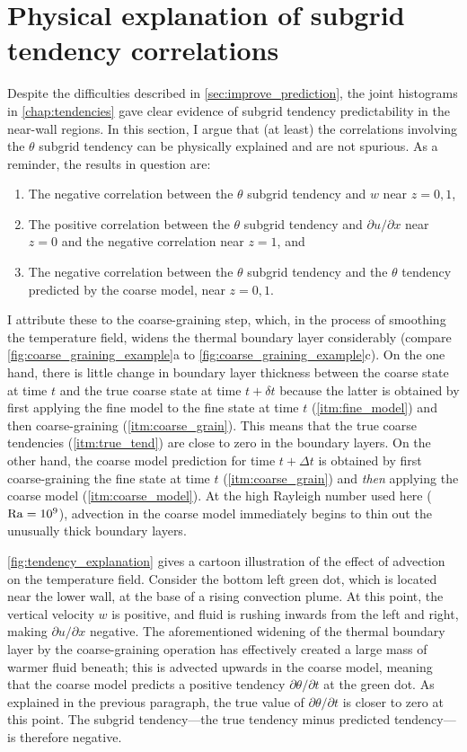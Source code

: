 \documentclass[../main.tex]{subfiles}
\begin{document}
\section{Physical explanation of subgrid tendency correlations}
\label{sec:tendency_explanation}
Despite the difficulties described in \cref{sec:improve_prediction}, the joint
histograms in \cref{chap:tendencies} gave clear evidence of subgrid tendency
predictability in the near-wall regions. In this section, I argue that
(at least) the correlations involving the $\theta$ subgrid tendency can
be physically explained and are not spurious. As a reminder, the results in
question are:
\begin{enumerate}
    \item The negative correlation between the $\theta$ subgrid tendency and
        $w$ near $z=0,1$,
    \item The positive correlation between the $\theta$ subgrid tendency and
        $\partial u/\partial x$ near $z=0$ and the negative correlation near
        $z=1$, and
    \item The negative correlation between the $\theta$ subgrid tendency and
        the $\theta$ tendency predicted by the coarse model, near $z=0,1$.
\end{enumerate}

I attribute these to the coarse-graining step, which, in the process of
smoothing the temperature field, widens the thermal boundary layer considerably
(compare \cref{fig:coarse_graining_example}a to
\cref{fig:coarse_graining_example}c). On the one hand, there is little change
in boundary layer thickness between the coarse state at time $t$ and the true
coarse state at time $t + \delta t$ because the latter is obtained by first
applying the fine model to the fine state at time $t$ (\cref{itm:fine_model})
and then coarse-graining (\cref{itm:coarse_grain}). This means that the true
coarse tendencies (\cref{itm:true_tend}) are close to zero in the boundary
layers. On the other hand, the coarse model prediction for time $t + \Delta t$
is obtained by first coarse-graining the fine state at time $t$
(\cref{itm:coarse_grain}) and \emph{then} applying the coarse model
(\cref{itm:coarse_model}). At the high Rayleigh number used here ($\mathrm{Ra} =
10^9$), advection in the coarse model immediately begins to thin out the
unusually thick boundary layers.

\cref{fig:tendency_explanation} gives a cartoon illustration of the effect of
advection on the temperature field. Consider the bottom left green dot,
which is located near the lower wall, at the base of a rising convection
plume. At this point, the vertical velocity $w$ is positive, and fluid is
rushing inwards from the left and right, making $\partial u/\partial x$
negative. The aforementioned widening of the thermal boundary layer by
the coarse-graining operation has effectively created a large mass of warmer
fluid beneath; this is advected upwards in the coarse model, meaning that
the coarse model predicts a positive tendency $\partial\theta/\partial t$
at the green dot. As explained in the previous paragraph, the true value of
$\partial\theta/\partial t$ is closer  to zero at this point. The subgrid
tendency---the true tendency minus predicted tendency---is therefore negative.
\end{document}
